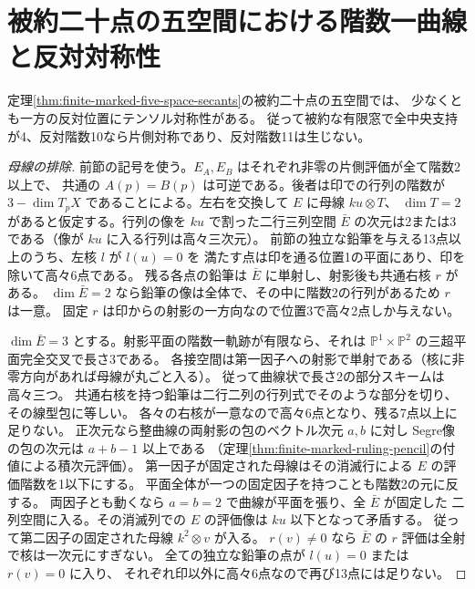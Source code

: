 \section{被約二十点の五空間における階数一曲線と反対対称性}
\label{sec:finite-five-space-rank-one-curves}
\begin{theorem}\label{thm:finite-five-space-rank-one-curves}
定理\ref{thm:finite-marked-five-space-secants}の被約二十点の五空間では、
少なくとも一方の反対位置にテンソル対称性がある。
従って被約な有限窓で全中央支持が4、反対階数10なら片側対称であり、反対階数11は生じない。
\end{theorem}
\begin{proof}[母線の排除]
前節の記号を使う。$E_A,E_B$ はそれぞれ非零の片側評価が全て階数2以上で、
共通の $A(p)=B(p)$ は可逆である。後者は印での行列の階数が
$3-\dim T_pX$ であることによる。左右を交換して $E$ に母線 $ku\otimes T$、
$\dim T=2$ があると仮定する。行列の像を $ku$ で割った二行三列空間
$\bar E$ の次元は2または3である（像が $ku$ に入る行列は高々三次元）。
前節の独立な鉛筆を与える13点以上のうち、左核 $l$ が $l(u)=0$ を
満たす点は印を通る位置1の平面にあり、印を除いて高々6点である。
残る各点の鉛筆は $\bar E$ に単射し、射影後も共通右核 $r$ がある。
$\dim\bar E=2$ なら鉛筆の像は全体で、その中に階数2の行列があるため $r$ は一意。
固定 $r$ は印からの射影の一方向なので位置3で高々2点しか与えない。

$\dim\bar E=3$ とする。射影平面の階数一軌跡が有限なら、それは
$\mathbb P^1\times\mathbb P^2$ の三超平面完全交叉で長さ3である。
各接空間は第一因子への射影で単射である（核に非零方向があれば母線が丸ごと入る）。
従って曲線状で長さ2の部分スキームは高々三つ。
共通右核を持つ鉛筆は二行二列の行列式でそのような部分を切り、その線型包に等しい。
各々の右核が一意なので高々6点となり、残る7点以上に足りない。
正次元なら整曲線の両射影の包のベクトル次元 $a,b$ に対し
Segre像の包の次元は $a+b-1$ 以上である
（定理\ref{thm:finite-marked-ruling-pencil}の付値による積次元評価）。
第一因子が固定された母線はその消滅行による $E$ の評価階数を1以下にする。
平面全体が一つの固定因子を持つことも階数2の元に反する。
両因子とも動くなら $a=b=2$ で曲線が平面を張り、全 $\bar E$ が固定した
二列空間に入る。その消滅列での $E$ の評価像は $ku$ 以下となって矛盾する。
従って第二因子の固定された母線 $k^2\otimes v$ が入る。
$r(v)\ne0$ なら $\bar E$ の $r$ 評価は全射で核は一次元にすぎない。
全ての独立な鉛筆の点が $l(u)=0$ または $r(v)=0$ に入り、
それぞれ印以外に高々6点なので再び13点には足りない。
\end{proof}
